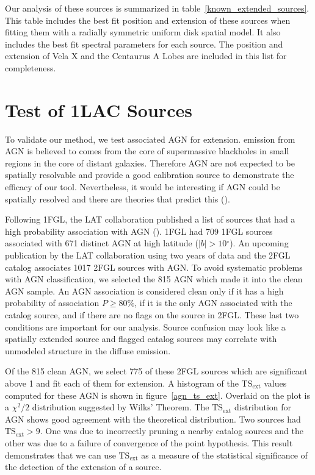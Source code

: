 \documentclass[12pt,preprint]{aastex}
\newcommand{\gev}{\text{GeV}\xspace}
\newcommand{\tsext}{{\ensuremath{\text{TS}_{\text{ext}}}}\xspace}
\renewcommand{\deg}{\ensuremath{^\circ}\xspace}
\begin{document}
Our analysis of these sources is summarized in
table~\ref{known_extended_sources}.  This table includes the best fit
position and extension of these sources when fitting them with a radially
symmetric uniform disk spatial model.  It also includes the best fit
spectral parameters for each source.  The position and extension of Vela
X and the Centaurus A Lobes are included in this list for completeness.

\section{Test of 1LAC Sources}
\label{test_1lac_sources}

To validate our method, we test associated AGN for extension.  \gev
emission from AGN is believed to comes from the core of supermassive
blackholes in small regions in the core of distant galaxies. Therefore AGN
are not expected to be spatially resolvable and provide a good calibration
source to demonstrate the efficacy of our tool. Nevertheless, it would
be interesting if AGN could be spatially resolved and there are theories
that predict this (\cite{pair_halo_paper}).

Following 1FGL, the LAT collaboration published a list of sources that
had a high probability association with AGN (\cite{first_agn_cat}).
1FGL had 709 1FGL sources associated with 671 distinct AGN at high
latitude ($|b|>10\deg$).  An upcoming publication by the LAT collaboration
using two years of data and the 2FGL catalog associates 1017 2FGL sources
with AGN.  To avoid systematic problems with AGN classification, we
selected the 815 AGN which made it into the clean AGN sample.  An AGN
association is considered clean only if it has a high probability
of association $P\ge 80\%$, if it is the only AGN associated with the
catalog source, and if there are no flags on the source in 2FGL. These
last two conditions are important for our analysis. Source
confusion may look like a spatially extended source and flagged catalog
sources may correlate with unmodeled structure in the diffuse emission.

Of the 815 clean AGN, we select 775 of these 2FGL sources which
are significant above 1 \gev and fit each of them for extension.
A histogram of the \tsext values computed for these AGN is shown in
figure~\ref{agn_ts_ext}. Overlaid on the plot is a $\chi^2/2$ distribution
suggested by Wilks' Theorem.  The \tsext distribution for AGN shows good
agreement with the theoretical distribution.  Two sources had $\tsext>9$.
One was due to incorrectly pruning a nearby catalog sources and the
other was due to a failure of convergence of the point hypothesis.
This result demonstrates that we can use \tsext as a measure of the
statistical significance of the detection of the extension of a source.
\end{document}
